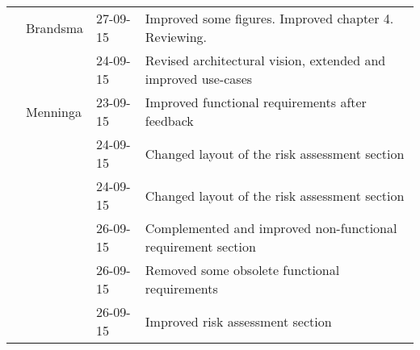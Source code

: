 \begin{longtable}{L{} L{} L{} L{}}
					 & Brandsma              & 27-09-15      & Improved some figures. Improved chapter 4. Reviewing.                                                                                                                                                                      \\
					 &                       & 24-09-15      & Revised architectural vision, extended and improved use-cases                                                                                                                                                              \\
					 & Menninga              & 23-09-15      & Improved functional requirements after feedback                                                                                                                                                                            \\
	                 & 		                 & 24-09-15      & Changed layout of the risk assessment section                                                                                                                                                                              \\
	                 &                       & 24-09-15      & Changed layout of the risk assessment section                                                                                                                                                                              \\
	                 &  	                 & 26-09-15      & Complemented and improved non-functional requirement section                                                                                                                                                               \\
	                 &                       & 26-09-15      & Removed some obsolete functional requirements                                                                                                                                                                              \\
	                 &                       & 26-09-15      & Improved risk assessment section                                                                                                                                                                                           \\	                 
	\midrule
			

\end{longtable}
